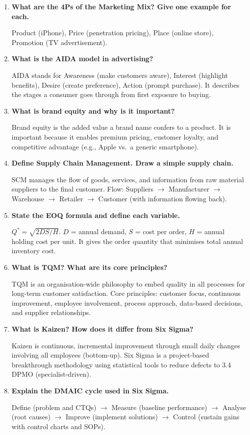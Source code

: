 \documentclass[12pt,a4paper]{article}
\newcommand{\Q}[1]{\textbf{#1}\par\noindent\ignorespaces}
\begin{document}
\begin{tcolorbox}[exambox, title={\textbf{Frequently Asked / Viva Questions}}]
\begin{enumerate}[topsep=0pt, label=\textbf{Q\arabic*.}, itemsep=5pt]
  \item \Q{What are the 4Ps of the Marketing Mix? Give one example for each.}
    Product (iPhone), Price (penetration pricing), Place (online store), Promotion (TV advertisement).
  \item \Q{What is the AIDA model in advertising?}
    AIDA stands for Awareness (make customers aware), Interest (highlight benefits), Desire (create preference), Action (prompt purchase). It describes the stages a consumer goes through from first exposure to buying.
  \item \Q{What is brand equity and why is it important?}
    Brand equity is the added value a brand name confers to a product. It is important because it enables premium pricing, customer loyalty, and competitive advantage (e.g., Apple vs.\ a generic smartphone).
  \item \Q{Define Supply Chain Management. Draw a simple supply chain.}
    SCM manages the flow of goods, services, and information from raw material suppliers to the final customer. Flow: Suppliers $\to$ Manufacturer $\to$ Warehouse $\to$ Retailer $\to$ Customer (with information flowing back).
  \item \Q{State the EOQ formula and define each variable.}
    $Q^* = \sqrt{2DS/H}$. $D$ = annual demand, $S$ = cost per order, $H$ = annual holding cost per unit. It gives the order quantity that minimises total annual inventory cost.
  \item \Q{What is TQM? What are its core principles?}
    TQM is an organisation-wide philosophy to embed quality in all processes for long-term customer satisfaction. Core principles: customer focus, continuous improvement, employee involvement, process approach, data-based decisions, and supplier relationships.
  \item \Q{What is Kaizen? How does it differ from Six Sigma?}
    Kaizen is continuous, incremental improvement through small daily changes involving all employees (bottom-up). Six Sigma is a project-based breakthrough methodology using statistical tools to reduce defects to 3.4 DPMO (specialist-driven).
  \item \Q{Explain the DMAIC cycle used in Six Sigma.}
    Define (problem and CTQs) $\to$ Measure (baseline performance) $\to$ Analyse (root causes) $\to$ Improve (implement solutions) $\to$ Control (sustain gains with control charts and SOPs).

\end{enumerate}
\end{tcolorbox}
\end{document}
